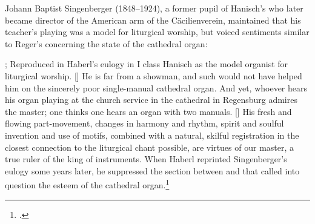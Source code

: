 Johann Baptist Singenberger (1848--1924), a former pupil of Hanisch's who later became director of the American arm of the Cäcilienverein, maintained that his teacher's playing was a model for liturgical worship, but voiced sentiments similar to Reger's concerning the state of the cathedral organ:

  {\cite[1]{SingenbergerHerrJosephHanisch1891}; Reproduced in Haberl's eulogy in \cite[105--106]{HaberlJosephHanischDomorganist1893}}
  {I class Hanisch as the model organist for liturgical worship. [\dagger{}] He is far from a showman, and such would not have helped him on the sincerely poor single-manual cathedral organ. And yet, whoever hears his organ playing at the church service in the cathedral in Regensburg admires the master; one thinks one hears an organ with two manuals. [\ddagger{}] His fresh and flowing part-movement, changes in harmony and rhythm, spirit and soulful invention and use of motifs, combined with a natural, skilful registration in the closest connection to the liturgical chant possible, are virtues of our master, a true ruler of the king of instruments.}
\noindent
When Haberl reprinted Singenberger's eulogy some years later, he suppressed the section between \dagger{} and \ddagger{} that called into question the esteem of the cathedral organ.\footcite[p.~i n.~*]{HaberlOrganumcomitansquod1900}

